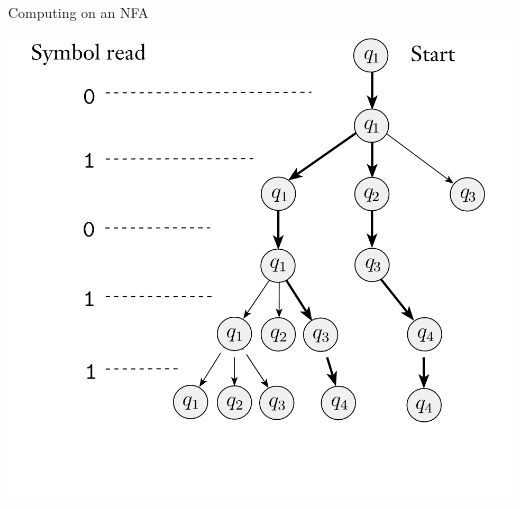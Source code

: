\documentclass[aspectratio=169]{beamer}
\begin{document}
\begin{frame}{Computing on an NFA}
    \begin{center}
        \includegraphics[scale=0.80]{N1_compute/N1_5.png}
    \end{center}
\end{frame}

\end{document}
